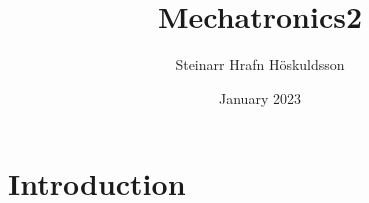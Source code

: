 \documentclass{article}
\title{Mechatronics2}
\author{Steinarr Hrafn Höskuldsson}
\date{January 2023}
\begin{document}
\maketitle

\section{Introduction}
\end{document}
